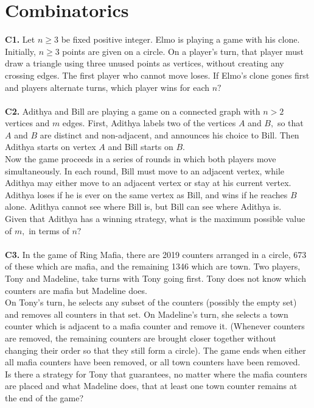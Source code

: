 \documentclass[12pt,a4paper]{article}
\begin{document}
\section*{Combinatorics}
\textbf{C1.} Let \(n \ge 3\) be fixed positive integer. Elmo is playing a game with his clone. Initially, \(n \ge 3\) points are given on a circle. On a player's turn, that player must draw a triangle using three unused points as vertices, without creating any crossing edges. The first player who cannot move loses. If Elmo's clone gones first and players alternate turns, which player wins for each \(n?\)\\
\\
\textbf{C2.} Adithya and Bill are playing a game on a connected graph with \(n > 2\) vertices and \(m\) edges. First, Adithya labels two of the vertices \(A\) and \(B,\) so that \(A\) and \(B\) are distinct and non-adjacent, and announces his choice to Bill. Then Adithya starts on vertex \(A\) and Bill starts on \(B.\)\\
Now the game proceeds in a series of rounds in which both players move simultaneously. In each round, Bill must move to an adjacent vertex, while Adithya may either move to an adjacent vertex or stay at his current vertex. Adithya loses if he is ever on the same vertex as Bill, and wins if he reaches \(B\) alone. Adithya cannot see where Bill is, but Bill can see where Adithya is.\\
Given that Adithya has a winning strategy, what is the maximum possible value of \(m,\) in terms of \(n?\)\\
\\
\textbf{C3.} In the game of Ring Mafia, there are 2019 counters arranged in a circle, 673 of these which are mafia, and the remaining 1346 which are town. Two players, Tony and Madeline, take turns with Tony going first. Tony does not know which counters are mafia but Madeline does.\\
On Tony's turn, he selects any subset of the counters (possibly the empty set) and removes all counters in that set. On Madeline's turn, she selects a town counter which is adjacent to a mafia counter and remove it. (Whenever counters are removed, the remaining counters are brought closer together without changing their order so that they still form a circle). The game ends when either all mafia counters have been removed, or all town counters have been removed.\\
Is there a strategy for Tony that guarantees, no matter where the mafia counters are placed and what Madeline does, that at least one town counter remains at the end of the game?\\
\end{document}
